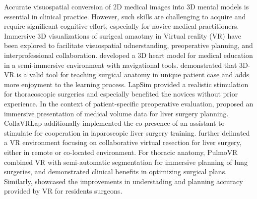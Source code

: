 \documentclass[manuscript]{acmart} %
\begin{document}
Accurate visuospatial conversion of 2D medical images into 3D mental models is essential in clinical practice. However, such skills are challenging to acquire and require significant cognitive effort, especially for novice medical practitioners. Immersive 3D visualizations of surigcal amaotmy in Virtual reality (VR) have been explored to facilitate visuospatial udnerstanding, preoperative planning, and interprofessional collaboration. \cite{RN86} developed a 3D heart model for medical education in a semi-immersive environment with navigational tools. \cite{RN5} demonstrated that 3D-VR is a valid tool for teaching surgical anatomy in unique patient case and adds more enjoyment to the learning process. LapSim \cite{RN90} provided a realistic stimulation for thoracoscopic surgeries and especially benefited the novices without prior experience. In the context of patient-specific preoperative evaluation, \cite{RN83} proposed an immersive presentation of medical volume data for liver surgery planning. CollaVRLap \cite{RN26} additionally implemented the co-presence of an assistant to stimulate for cooperation in laparoscopic liver surgery training. \cite{RN6} further delinated a VR environment focusing on collaborative virtual resection for liver surgery, either in remote or co-located environment. For thoracic anatomy, PulmoVR \cite{RN10, RN13} combined VR with semi-automatic segmentation for immersive planning of lung surgeries, and demonstrated clinical benefits in optimizing surgical plans. Similarly, \cite{RN44} showcased the improvements in understading and planning accuracy provided by VR for residents surgeons.
\end{document}
